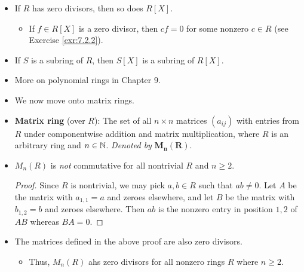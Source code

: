 \documentclass[../notes.tex]{subfiles}
\begin{document}
\begin{itemize}
\begin{proposition}
\begin{enumerate}
\begin{proof}
\begin{equation*}
                    \deg p(x)+\deg q(x) = \deg p(x)q(x) = 0
                    \quad\Longleftrightarrow\quad
                    \deg p(x)=\deg q(x) = 0
                \end{equation*}
                Therefore, $p(x),q(x)\in R$ and hence are units of $R$, as desired.
            \end{proof}
            \item $R[X]$ is an integral domain.
            \begin{proof}
                We have already established that the commutativity and identity of $R[X]$ follow from $R$. As to no zero divisors, this constraint follows from part (1).
            \end{proof}
        \end{enumerate}
    \end{proposition}
    \item If $R$ has zero divisors, then so does $R[X]$.
    \begin{itemize}
        \item If $f\in R[X]$ is a zero divisor, then $cf=0$ for some nonzero $c\in R$ (see Exercise \ref{exr:7.2.2}).
    \end{itemize}
    \item If $S$ is a subring of $R$, then $S[X]$ is a subring of $R[X]$.
    \item More on polynomial rings in Chapter 9.
    \item {}We now move onto matrix rings.
    \item \textbf{Matrix ring} (over $R$): The set of all $n\times n$ matrices $(a_{ij})$ with entries from $R$ under componentwise addition and matrix multiplication, where $R$ is an arbitrary ring and $n\in\mathbb{N}$. \emph{Denoted by} $\bm{M_n(R)}$.
    \item $M_n(R)$ is \emph{not} commutative for all nontrivial $R$ and $n\geq 2$.
    \begin{proof}
        Since $R$ is nontrivial, we may pick $a,b\in R$ such that $ab\neq 0$. Let $A$ be the matrix with $a_{1,1}=a$ and zeroes elsewhere, and let $B$ be the matrix with $b_{1,2}=b$ and zeroes elsewhere. Then $ab$ is the nonzero entry in position $1,2$ of $AB$ whereas $BA=0$.
    \end{proof}
    \item The matrices defined in the above proof are also zero divisors.
    \begin{itemize}
        \item Thus, $M_n(R)$ ahs zero divisors for all nonzero rings $R$ where $n\geq 2$.

\end{itemize}
\end{itemize}
\end{document}
